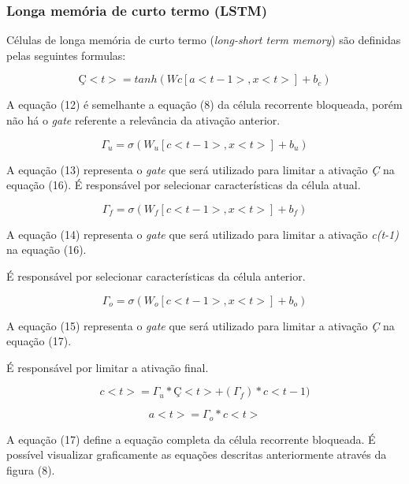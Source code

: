 \documentclass[12pt]{article}
\begin{document}
\subsubsection{Longa memória de curto termo (LSTM)}

Células de longa memória de curto termo (\textit{long-short term memory}) são definidas pelas seguintes formulas:

\begin{equation}
    Ç<t> = tanh(Wc[a<t-1>, x<t>]+b_c)
\end{equation}

A equação (12) é semelhante a equação (8) da célula recorrente bloqueada, porém não há o \textit{gate} referente a relevância da ativação anterior.

\begin{equation}
    \Gamma_u = \sigma(W_u[c<t-1>, x<t>]+b_u)
\end{equation}

A equação (13) representa o \textit{gate} que será utilizado para limitar a ativação \textit{Ç} na equação (16). É responsável por selecionar características da célula atual.

\begin{equation}
    \Gamma_f = \sigma(W_f[c<t-1>, x<t>]+b_f)
\end{equation}

A equação (14) representa o \textit{gate} que será utilizado para limitar a ativação \textit{c(t-1)} na equação (16).

É responsável por selecionar características da célula anterior.

\begin{equation}
    \Gamma_o = \sigma(W_o[c<t-1>, x<t>]+b_o)
\end{equation}

A equação (15) representa o \textit{gate} que será utilizado para limitar a ativação \textit{Ç} na equação (17).

É responsável por limitar a ativação final.

\begin{equation}
    c<t>=\Gamma_u*Ç<t>+(\Gamma_f)*c<t-1)
\end{equation}

\begin{equation}
    a<t>=\Gamma_o*c<t>
\end{equation}

A equação (17) define a equação completa da célula recorrente bloqueada. É possível visualizar graficamente as equações descritas anteriormente através da figura (8).
\end{document}
